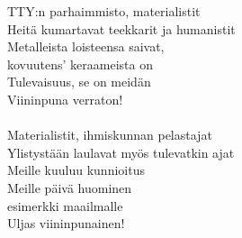 
TTY:n parhaimmisto, materialistit \\ Heitä kumartavat teekkarit ja humanistit \\ Metalleista loisteensa saivat, \\ kovuutens' keraameista on \\ Tulevaisuus, se on meidän \\ Viininpuna verraton! \\ \hspace{10mm} \\ Materialistit, ihmiskunnan pelastajat \\ Ylistystään laulavat myös tulevatkin ajat \\ Meille kuuluu kunnioitus \\ Meille päivä huominen \\ esimerkki maailmalle \\ Uljas viininpunainen!